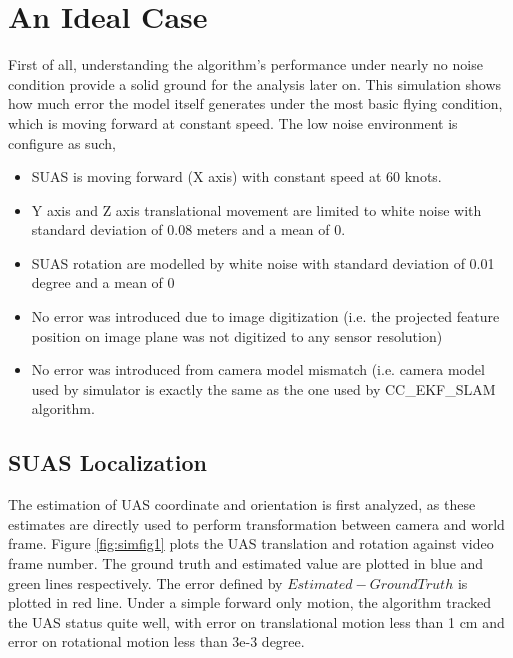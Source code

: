 \section{An Ideal Case}
First of all, understanding the algorithm's performance under nearly no noise condition provide a solid ground for the analysis later on. This simulation shows how much error the model itself generates under the most basic flying condition, which is moving forward at constant speed. The low noise environment is configure as such,

\begin{itemize}
  \item SUAS is moving forward (X axis) with constant speed at 60 knots. 
  \item Y axis and Z axis translational movement are limited to white noise with standard deviation of 0.08 meters and a mean of 0.
  \item SUAS rotation are modelled by white noise with standard deviation of 0.01 degree and a mean of 0
  \item No error was introduced due to image digitization (i.e. the projected feature position on image plane was not digitized to any sensor resolution)
  \item No error was introduced from camera model mismatch (i.e. camera model used by simulator is exactly the same as the one used by CC\_EKF\_SLAM algorithm.
\end{itemize}

\subsection{SUAS Localization}
The estimation of UAS coordinate and orientation is first analyzed, as these estimates are directly used to perform transformation between camera and world frame. Figure \ref{fig:simfig1} plots the UAS translation and rotation against video frame number. The ground truth and estimated value are plotted in blue and green lines respectively. The error defined by $Estimated-Ground Truth$ is plotted in red line. Under a simple forward only motion, the algorithm tracked the UAS status quite well, with error on translational motion less than 1 cm and error on rotational motion less than 3e-3 degree. 

